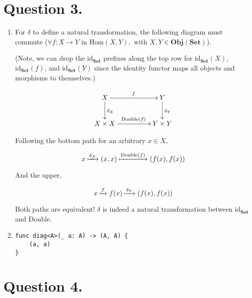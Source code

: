 \documentclass{article}
\begin{document}
\section*{Question 3.}

\begin{enumerate}[label=(\alph*)]

\item For $\delta$ to define a natural transformation, the following diagram must commute ($\forall f: X \rightarrow Y$ in $\textrm{Hom}(X, Y), \textrm{ with } X, Y \in \textbf{Obj}(\textbf{Set})$).

(Note, we can drop the $\textrm{id}_{\textbf{Set}}$ prefixes along the top row for $\textrm{id}_{\textbf{Set}}(X)$,  $\textrm{id}_{\textbf{Set}}(f)$, and $\textrm{id}_{\textbf{Set}}(Y)$ since the identity functor maps all objects and morphisms to themselves.)

\[\xymatrixcolsep{4pc}\xymatrix{
X \ar[d]^{\delta_X} \ar[r]^f &Y\ar[d]^{\delta_Y}\\
X \times X \ar[r]^{\textrm{Double}(f)}          &Y \times Y}
\]

Following the bottom path for an arbitrary $x \in X$,

\[x \xmapsto{\delta_X} (x, x) \xmapsto{\textrm{Double}(f)} (f(x), f(x))\]

And the upper,

\[x \xmapsto{f} f(x) \xmapsto{\delta_Y} (f(x), f(x))\]

Both paths are equivalent! $\delta$ is indeed a natural transformation between $\textrm{id}_{\textbf{Set}}$ and $\textrm{Double}$.

\item

\begin{verbatim}
func diag<A>(_ a: A) -> (A, A) {
	(a, a)
}
\end{verbatim}

\end{enumerate}

\section*{Question 4.}
\end{document}
